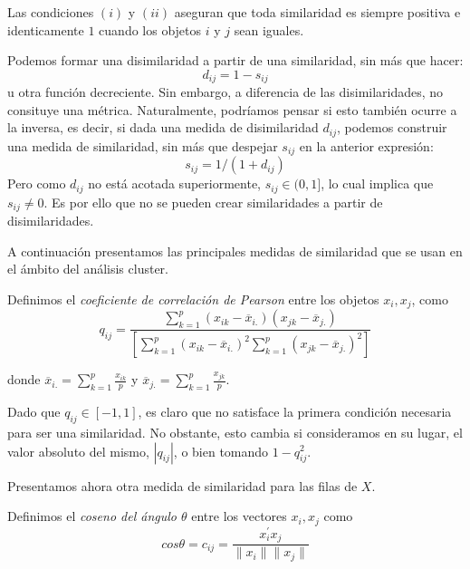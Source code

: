 Las condiciones $(i)$ y $(ii)$ aseguran que toda similaridad es siempre positiva e identicamente $1$ cuando los objetos $i$ y $j$ sean iguales. \newline

\begin{observacion}
    Podemos formar una disimilaridad a partir de una similaridad, sin más que hacer:
    \[
    d_{ij} = 1 - s_{ij}
    \]
    u otra función decreciente. Sin embargo, a diferencia de las disimilaridades, no consituye una métrica. \newline
    Naturalmente, podríamos pensar si esto también ocurre a la inversa, es decir, si dada una medida de disimilaridad $d_{ij}$, podemos construir una medida de similaridad, sin más que 
    despejar $s_{ij}$ en la anterior expresión: 
    \[
    s_{ij} = 1/(1+d_{ij})
    \]
    Pero como $d_{ij}$ no está acotada superiormente, $s_{ij} \in (0,1]$, lo cual implica que $s_{ij} \neq 0$. Es por ello que no se pueden crear similaridades a partir de
    disimilaridades.
\end{observacion}

A continuación presentamos las principales medidas de similaridad que se usan en el ámbito del análisis cluster. \newline

\begin{definicion}
Definimos el \textit{coeficiente de correlación de Pearson} entre los objetos $x_{i},x_{j}$, como
\[
q_{ij} = \frac{\sum_{k=1}^{p}(x_{ik}-\overline{x}_{i.})(x_{jk}-\overline{x}_{j.})}{\left[\sum_{k=1}^{p}(x_{ik}-\overline{x}_{i.})^{2}\sum_{k=1}^{p}(x_{jk}-\overline{x}_{j.})^{2} \right]}
\]   
\end{definicion}

donde $\overline{x}_{i.} = \sum_{k=1}^{p}\frac{x_{ik}}{p}$ y $\overline{x}_{j.} = \sum_{k=1}^{p}\frac{x_{jk}}{p}$. \newline

\begin{observacion}
    Dado que $q_{ij} \in [-1,1]$, es claro que no satisface la primera condición necesaria para ser una similaridad. No obstante, esto cambia si consideramos en su lugar, el 
    valor absoluto del mismo, $|q_{ij}|$, o bien tomando $1-q_{ij}^{2}$. 
\end{observacion}

Presentamos ahora otra medida de similaridad para las filas de $X$.

\begin{definicion}
    Definimos el \textit{coseno del ángulo $\theta$} entre los vectores $x_{i},x_{j}$ como
    \[
    cos \theta = c_{ij} = \frac{x_{i}^{'}x_{j}}{\|x_{i}\| \|x_{j}\|}
    \]
\end{definicion}

